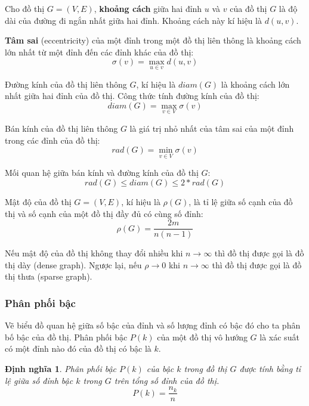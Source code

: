 \documentclass[14pt, oneside, a4paper, openany]{scrartcl}
\newtheorem{definition}{Định nghĩa}[section]
\begin{document}
\cite{graphtextbook} Cho đồ thị $G=(V,E)$, \textbf{khoảng cách}  giữa hai đỉnh $u$ và $v$ của đồ thị $G$ là độ dài của đường đi ngắn nhất giữa hai đỉnh. Khoảng cách này kí hiệu là $d(u,v)$.

\cite{graphtextbook} \textbf{Tâm sai}  (eccentricity) của một đỉnh trong một đồ thị liên thông là khoảng cách lớn nhất từ một đỉnh đến các đỉnh khác của đồ thị:
\begin{equation}
\sigma(v) = \max_{u \in v} d(u,v)
\end{equation}

\cite{graphtextbook} Đường kính của đồ thị liên thông $G$, kí hiệu là $diam(G)$ là khoảng cách lớn nhất giữa hai đỉnh của đồ thị. Công thức tính đường kính của đồ thị:
\begin{equation}
diam(G) = \max_{v \in V} \sigma(v)
\end{equation}

\cite{graphtextbook} Bán kính của đồ thị liên thông $G$ là giá trị nhỏ nhất của tâm sai của một đỉnh trong các đỉnh của đồ thị:
\begin{equation}
rad(G) = \min_{v \in V} \sigma(v)
\end{equation}

\cite{graphtextbook} Mối quan hệ giữa bán kính và đường kính của đồ thị $G$:
\begin{equation}
rad(G) \leq diam(G) \leq 2 * rad(G)
\end{equation}

\cite{complexnetwork} Mật độ của đồ thị $G=(V,E)$, kí hiệu là $\rho(G)$, là tỉ lệ giữa số cạnh của đồ thị và số cạnh của một đồ thị đầy đủ có cùng số đỉnh:
\begin{equation}
\rho(G) = \frac{2m}{n(n-1)}
\end{equation}

Nếu mật độ của đồ thị không thay đổi nhiều khi $n \rightarrow \infty$ thì đồ thị được gọi là đồ thị dày (dense graph). Ngược lại, nếu $\rho \rightarrow 0$ khi $n \rightarrow \infty$ thì đồ thị được gọi là đồ thị thưa (sparse graph).

\subsubsection{Phân phối bậc}
Vẽ biểu đồ quan hệ giữa số bậc của đỉnh và số lượng đỉnh có bậc đó cho ta phân bố bậc của đồ thị. Phân phối bậc $P(k)$ của một đồ thị vô hướng $G$ là xác suất có một đỉnh nào đó của đồ thị có bậc là $k$.
\begin{definition}
	Phân phối bậc $P(k)$ của bậc $k$ trong đồ thị $G$ được tính bằng tỉ lệ giữa số đỉnh bậc $k$ trong $G$ trên tổng số đỉnh của đồ thị.
	\begin{equation}
	P(k) = \frac{n_k}{n}
	\end{equation}
\end{definition}
\end{document}
